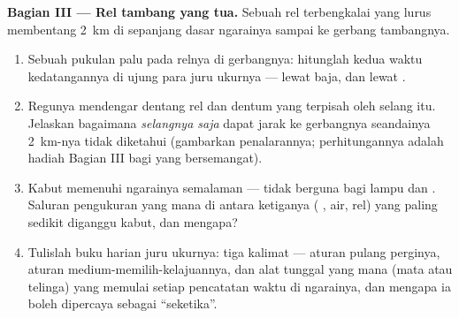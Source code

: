 \begin{problem}
\medskip\noindent\textbf{Bagian III --- Rel tambang yang tua.}
Sebuah rel terbengkalai yang lurus membentang \qty{2}{km} di sepanjang
dasar ngarainya sampai ke gerbang tambangnya.
\begin{enumerate}[resume]
  \item Sebuah pukulan palu pada relnya di gerbangnya: hitunglah
        kedua waktu kedatangannya di ujung para juru ukurnya ---
        lewat baja, dan lewat .
  \item Regunya mendengar dentang rel dan dentum  yang terpisah
        oleh selang itu. Jelaskan bagaimana \emph{selangnya saja}
        dapat  jarak ke gerbangnya seandainya \qty{2}{km}-nya
        tidak diketahui (gambarkan penalarannya; perhitungannya adalah
        hadiah Bagian III bagi yang bersemangat).
  \item Kabut memenuhi ngarainya semalaman --- tidak berguna bagi
        lampu dan . Saluran pengukuran yang mana di antara
        ketiganya ( ,  air,  rel) yang paling
        sedikit diganggu kabut, dan mengapa?
  \item Tulislah buku harian juru ukurnya: tiga kalimat --- aturan
        pulang perginya, aturan medium-memilih-kelajuannya, dan alat
        tunggal yang mana (mata atau telinga) yang memulai setiap
        pencatatan waktu di ngarainya, dan mengapa ia boleh dipercaya
        sebagai ``seketika''.
\end{enumerate}
\end{problem}
